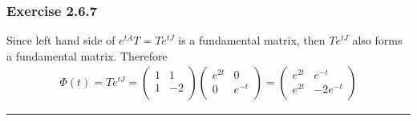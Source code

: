 \documentclass[12pt, letterpaper]{scrartcl}
\begin{document}
\subsubsection*{Exercise 2.6.7}
Since left hand side of $e^{tA}T=Te^{tJ}$ is a fundamental matrix, then $Te^{tJ}$ also forms a fundamental matrix. Therefore
\begin{align*}
    \Phi(t)=Te^{tJ}=\left(\begin{array}{cc} 
    1 & 1 \\ 1 & -2 \\ 
    \end{array}\right)
    \left(\begin{array}{cc}
        e^{2t} & 0 \\
        0 & e^{-t} \\
    \end{array}\right)
    =
    \left(\begin{array}{cc}
        e^{2t} & e^{-t} \\
        e^{2t} & -2e^{-t} \\
    \end{array}\right)
\end{align*}
\vskip1mm\hrule
\clearpage
\end{document}
